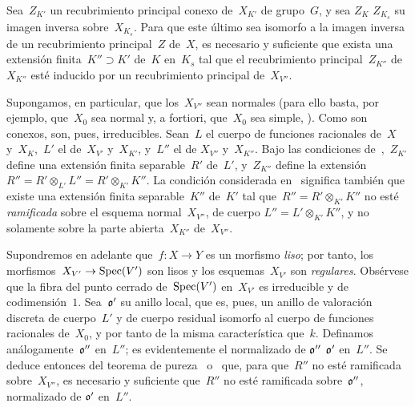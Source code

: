 \begin{lemme}
\label{X.3.7}
Sea~$Z_{K'}$ un recubrimiento principal conexo de~$X_{K'}$ de grupo~$G$, y sea
{$Z_{K}$}
{$Z_{K_s}$}
su imagen inversa sobre~$X_{K_s}$\quoi. Para que este último sea isomorfo a la
imagen inversa de un recubrimiento principal~$Z$ de~$X$, es necesario y
suficiente que exista una extensión finita~$K''\supset K'$ de~$K$ en~$K_s$ tal
que el recubrimiento principal~$Z_{K''}$ de~$X_{K''}$ esté inducido por un
recubrimiento principal de~$X_{V''}$.
\end{lemme}

Supongamos, en particular, que los~$X_{V''}$ sean normales (para ello basta,
por ejemplo, que~$X_0$ sea normal y, a fortiori, que~$X_0$ sea simple,
\cf {}).
Como son conexos, son, pues, irreducibles. Sean~$L$ el cuerpo de funciones
racionales de~$X$ y~$X_{K}$,~$L'$ el de~$X_{V'}$ y~$X_{K'}$, y~$L''$ el de
$X_{V''}$ y~$X_{K''}$\quoi. Bajo las condiciones de~,~$Z_{K'}$
define una extensión finita separable~$R'$ de~$L'$, y~$Z_{K''}$ define la
extensión~$R''=R'\otimes_{L'}L'' = R'\otimes_{K'}K''$. La condición
considerada en~ significa también que existe una extensión finita
separable~$K''$ de~$K'$ tal que~$R''=R'\otimes_{K'}K''$ no esté
\emph{ramificada} sobre el esquema normal~$X_{V''}$, de cuerpo
$L''=L'\otimes_{K'}K''$, y no solamente sobre la parte abierta~$X_{K''}$
de~$X_{V''}$.

Supondremos en adelante que~$f\colon X\to Y$ es un morfismo \emph{liso}; por
tanto, los morfismos~$X_{V'}\to\operatorname{Spec}(V')$ son lisos y los esquemas~$X_{V'}$
son \emph{regulares}. Obsérvese que la fibra del punto cerrado de~$\operatorname{Spec}(V')$
en~$X_{V'}$ es irreducible y de codimensión~$1$. Sea~$\mathfrak{o'}$ su anillo
local, que es, pues, un anillo de valoración discreta de cuerpo~$L'$ y de
cuerpo residual isomorfo al cuerpo de funciones racionales de~$X_0$, y por
tanto de la misma característica que~$k$. Definamos análogamente~$\mathfrak{o''}$
en~$L''$; es evidentemente el normalizado de
{$\mathfrak{o''}$}
{$\mathfrak{o'}$}
en~$L''$. Se deduce entonces del teorema de pureza~ o~
que, para que~$R''$ no esté ramificada sobre~$X_{V''}$, es necesario y
suficiente que~$R''$ no esté ramificada sobre~$\mathfrak{o''}$, normalizado de
$\mathfrak{o'}$ en~$L''$.


